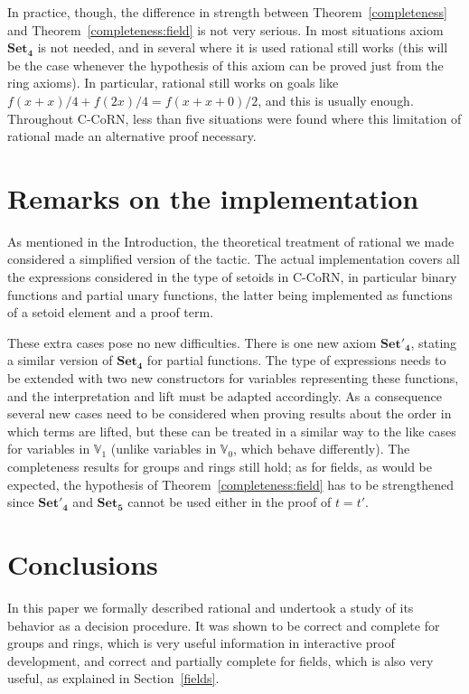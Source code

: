 \documentclass{article}
\newcommand{\V}{{\mathbb V}}
\newcommand{\tacticname}[1]{\textsf{#1}}
\newcommand{\rational}{\tacticname{rational}}
\newcommand{\axiom}[1]{\ensuremath{\mathbf{#1}}}
\begin{document}
In practice, though, the difference in strength between
Theorem~\ref{completeness} and Theorem~\ref{completeness:field} is not
very serious.  In most situations axiom \axiom{Set_4} is not needed,
and in several where it is used {\rational} still works (this will be
the case whenever the hypothesis of this axiom can be proved just from
the ring axioms).  In particular, {\rational} still works on goals
like $f(x+x)/4+f(2x)/4=f(x+x+0)/2$, and this is usually enough.
Throughout C-CoRN, less than five situations were found where this
limitation of {\rational} made an alternative proof necessary.

\section{Remarks on the implementation}\label{extensions}

As mentioned in the Introduction, the theoretical treatment of {\rational}
we made considered a simplified version of the tactic.
The actual implementation covers all the expressions considered in the
type of setoids in C-CoRN, in particular binary functions and partial unary
functions, the latter being implemented as functions of a setoid element
and a proof term.

These extra cases pose no new difficulties.
There is one new axiom \axiom{Set'_4}, stating a similar version of
\axiom{Set_4} for partial functions.
The type of expressions needs to be extended with two new constructors
for variables representing these functions, and the interpretation and
lift must be adapted accordingly.
As a consequence several new cases need to be considered when proving
results about the order in which terms are lifted, but these can be
treated in a similar way to the like cases for variables in $\V_1$
(unlike variables in $\V_0$, which behave differently).
The completeness results for groups and rings still hold; as for
fields, as would be expected, the hypothesis of
Theorem~\ref{completeness:field} has to be strengthened since
\axiom{Set'_4} and \axiom{Set_5} cannot be used either in the proof of
$t=t'$.

\section{Conclusions}\label{concl}

In this paper we formally described {\rational} and undertook a study
of its behavior as a decision procedure.  It was shown to be correct
and complete for groups and rings, which is very useful information in
interactive proof development, and correct and partially complete for
fields, which is also very useful, as explained in Section~\ref{fields}.
\end{document}

